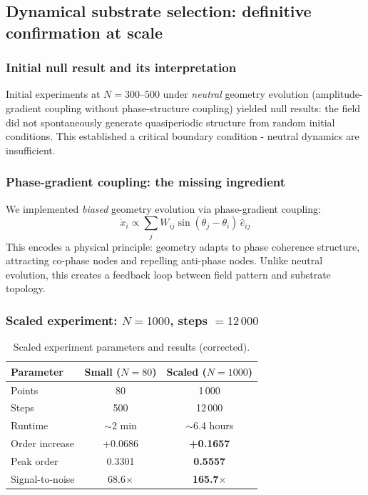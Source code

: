 \documentclass[12pt,a4paper]{article}
\theoremstyle{plain}
\theoremstyle{definition}
\begin{document}
\subsection{Dynamical substrate selection: definitive confirmation at scale}
\label{sec:dynamical}

\subsubsection{Initial null result and its interpretation}

Initial experiments at $N = 300$--$500$ under \emph{neutral} geometry
evolution (amplitude-gradient coupling without phase-structure coupling)
yielded null results: the field did not spontaneously generate quasiperiodic
structure from random initial conditions. This established a critical
boundary condition - neutral dynamics are insufficient.

\subsubsection{Phase-gradient coupling: the missing ingredient}

We implemented \emph{biased} geometry evolution via phase-gradient
coupling:
\begin{equation}
\dot{x}_i \propto \sum_j W_{ij} \sin(\theta_j - \theta_i)\, \hat{e}_{ij}
\end{equation}
This encodes a physical principle: geometry adapts to phase coherence
structure, attracting co-phase nodes and repelling anti-phase nodes.
Unlike neutral evolution, this creates a feedback loop between field
pattern and substrate topology.

\subsubsection{Scaled experiment: $N = 1000$, steps $= 12\,000$}

\begin{table}[H]
\centering
\caption{Scaled experiment parameters and results (corrected).}
\label{tab:scaled}
\begin{tabular}{lcc}
\toprule
\textbf{Parameter} & \textbf{Small ($N=80$)} & \textbf{Scaled ($N=1000$)} \\
\midrule
Points          & 80    & 1\,000 \\
Steps           & 500   & 12\,000 \\
Runtime         & $\sim$2 min & $\sim$6.4 hours \\
Order increase  & +0.0686 & \textbf{+0.1657} \\
Peak order      & 0.3301  & \textbf{0.5557} \\
Signal-to-noise & 68.6$\times$ & \textbf{165.7$\times$} \\
\bottomrule
\end{tabular}
\end{table}
\end{document}
